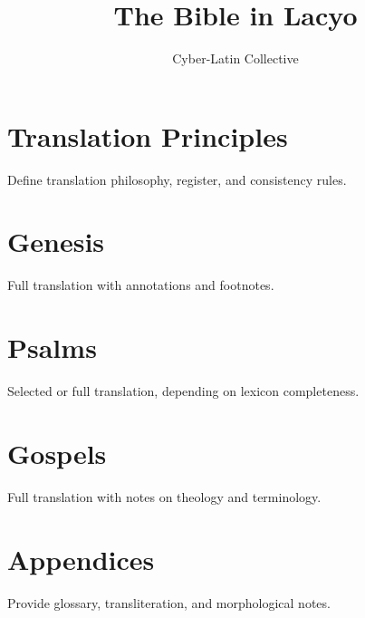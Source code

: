 \documentclass[12pt]{book}
\title{The Bible in Lacyo}
\author{Cyber-Latin Collective}
\date{}
\begin{document}
\maketitle
\tableofcontents

\chapter{Translation Principles}
Define translation philosophy, register, and consistency rules.

\chapter{Genesis}
Full translation with annotations and footnotes.

\chapter{Psalms}
Selected or full translation, depending on lexicon completeness.

\chapter{Gospels}
Full translation with notes on theology and terminology.

\chapter{Appendices}
Provide glossary, transliteration, and morphological notes.
\end{document}
